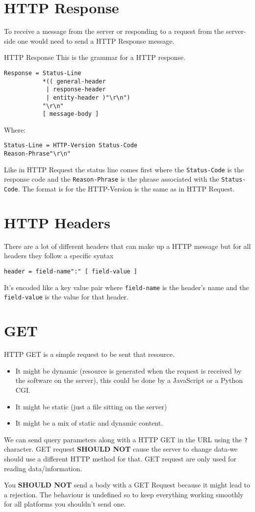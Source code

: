 \documentclass[../CMPUT-404-Notes.tex]{subfiles}
\begin{document}
\section{HTTP Response}
To receive a message from the server or responding to a request from the server-side one would need to send a HTTP Response message.
\begin{Definition}
{HTTP Response}
This is the grammar for a HTTP response.
\begin{verbatim}
Response = Status-Line
           *(( general-header
            | response-header 
            | entity-header )"\r\n")
           "\r\n"
           [ message-body ]
\end{verbatim}
Where:
\begin{verbatim}
Status-Line = HTTP-Version Status-Code 
Reason-Phrase"\r\n"
\end{verbatim}
Like in HTTP Request the status line comes first where the \texttt{Status-Code} is the response code and the \texttt{Reason-Phrase} is the phrase associated with the \texttt{Status-Code}.
The format is for the HTTP-Version is the same as in HTTP Request.
\end{Definition}

\section{HTTP Headers}
There are a lot of different headers that can make up a HTTP message but for all headers they follow a specific syntax
\begin{verbatim}
header = field-name":" [ field-value ]
\end{verbatim}
It's encoded like a key value pair where \texttt{field-name} is the header's name and the \texttt{field-value} is the value for that header. 

\section{GET}
HTTP GET is a simple request to be sent that resource.
\begin{itemize}
  \item It might be dynamic (resource is generated when the request is received by the software on the server), this could be done by a JavaScript or a Python CGI.
  \item It might be static (just a file sitting on the server)
  \item It might be a mix of static and dynamic content.
\end{itemize}
We can send query parameters along with a HTTP GET in the URL using the \texttt{?} character.
GET request \textbf{SHOULD NOT} cause the server to change data-we should use a different HTTP method for that. 
GET request are only used for reading data/information.
\begin{Note}
  You \textbf{SHOULD NOT} send a body with a GET Request because it might lead to a rejection. The behaviour is undefined so to keep everything working smoothly for all platforms you shouldn't send one.
\end{Note}
\end{document}
